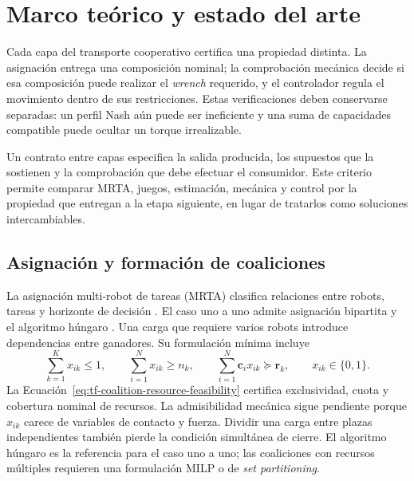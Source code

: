 \section{Marco teórico y estado del arte}
\label{sec:theoretical-framework}

Cada capa del transporte cooperativo certifica una propiedad distinta. La asignación entrega una composición nominal; la comprobación mecánica decide si esa composición puede realizar el \emph{wrench} requerido, y el controlador regula el movimiento dentro de sus restricciones. Estas verificaciones deben conservarse separadas: un perfil Nash aún puede ser ineficiente y una suma de capacidades compatible puede ocultar un torque irrealizable.

Un contrato entre capas especifica la salida producida, los supuestos que la sostienen y la comprobación que debe efectuar el consumidor. Este criterio permite comparar MRTA, juegos, estimación, mecánica y control por la propiedad que entregan a la etapa siguiente, en lugar de tratarlos como soluciones intercambiables.

\subsection{Asignación y formación de coaliciones}
\label{subsec:tf-mrta}

La asignación multi-robot de tareas (MRTA) clasifica relaciones entre robots, tareas y horizonte de decisión \parencite{gerkeyMataric2004MRTA,korsahStentzDias2013iTax}. El caso uno a uno admite asignación bipartita y el algoritmo húngaro \parencite{kuhn1955Hungarian}. Una carga que requiere varios robots introduce dependencias entre ganadores. Su formulación mínima incluye
\begin{equation}
  \sum_{k=1}^{K}x_{ik}\leq 1,\qquad
  \sum_{i=1}^{N}x_{ik}\geq n_k,\qquad
  \sum_{i=1}^{N}\boldsymbol c_i x_{ik}\succeq \boldsymbol r_k,
  \qquad x_{ik}\in\{0, 1\}.
  \label{eq:tf-coalition-resource-feasibility}
\end{equation}
La Ecuación~\eqref{eq:tf-coalition-resource-feasibility} certifica exclusividad, cuota y cobertura nominal de recursos. La admisibilidad mecánica sigue pendiente porque \(x_{ik}\) carece de variables de contacto y fuerza. Dividir una carga entre plazas independientes también pierde la condición simultánea de cierre. El algoritmo húngaro es la referencia para el caso uno a uno; las coaliciones con recursos múltiples requieren una formulación MILP o de \emph{set partitioning}.

